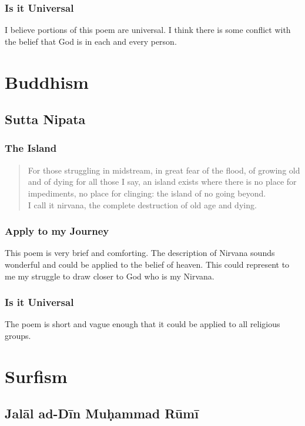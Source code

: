 \documentclass[11pt,a4paper]{scrartcl} %
\begin{document}
\subsubsection{Is it Universal}
I believe portions of this poem are universal. I think there is some conflict with the belief that God is in each and every person. 
    \section{Buddhism}
    \subsection{Sutta Nipata} 
\subsubsection{The Island}  
\begin{verse}
For those struggling in midstream, in great fear of the flood, of growing old and of dying for all those I say, an island exists where there is no place for impediments, no place for clinging: the island of no going beyond.\\ 
I call it nirvana, the complete destruction of old age and dying.
\end{verse}
\textcolor{brown}{\citealp[pg. 200]{eknath}}

\subsubsection{Apply to my Journey}
This poem is very brief and comforting. The description of Nirvana sounds wonderful and could be applied to the belief of heaven. This could represent to me my struggle to draw closer to God who is my Nirvana. 
\subsubsection{Is it Universal}
The poem is short and vague enough that it could be applied to all religious groups.
    \section{Surfism}
    \subsection{Jal\={a}l ad-D\={i}n Muḥammad R\={u}m\={i} }
\end{document}
